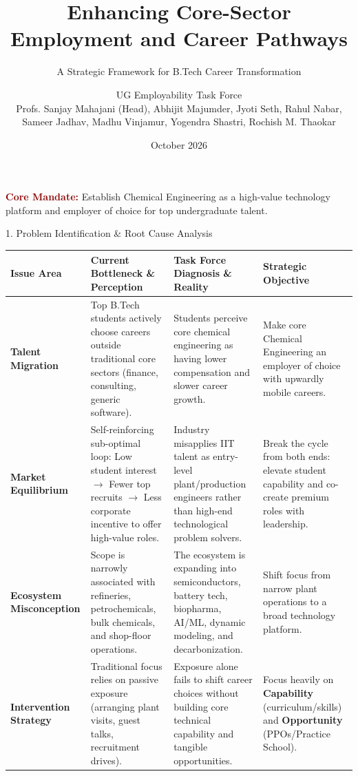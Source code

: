 \documentclass[aspectratio=169, 10pt]{beamer}
\title[IITB ChE Core Employability Roadmap]{Enhancing Core-Sector Employment and Career Pathways}
\subtitle{A Strategic Framework for B.Tech Career Transformation}
\author[UG Employability Task Force]{UG Employability Task Force \\ \small Profs. Sanjay Mahajani (Head), Abhijit Majumder, Jyoti Seth,  Rahul Nabar, Sameer Jadhav,  Madhu Vinjamur, Yogendra Shastri, Rochish M. Thaokar}
\institute[IIT Bombay]{Department of Chemical Engineering \\ Indian Institute of Technology Bombay}
\date{October 2026}
\begin{document}
\begin{frame}
  \titlepage
  \begin{center}
    \small \textcolor{darkred}{\textbf{Core Mandate:}} Establish Chemical Engineering as a high-value technology platform and employer of choice for top undergraduate talent.
  \end{center}
\end{frame}

\begin{frame}{1. Problem Identification \& Root Cause Analysis}
  \scriptsize
  \renewcommand{\arraystretch}{1.25}
  \centering
  \begin{tabular}{L{2.2cm} L{3.8cm} L{4.2cm} L{3.5cm}}
    \toprule
    \textbf{Issue Area} & \textbf{Current Bottleneck \& Perception} & \textbf{Task Force Diagnosis \& Reality} & \textbf{Strategic Objective} \\
    \midrule
    \textbf{Talent Migration} & Top B.Tech students actively choose careers outside traditional core sectors (finance, consulting, generic software). & Students perceive core chemical engineering as having lower compensation and slower career growth. & Make core Chemical Engineering an employer of choice with upwardly mobile careers. \\
    \addlinespace[3pt]
    \textbf{Market Equilibrium} & Self-reinforcing sub-optimal loop: Low student interest $\rightarrow$ Fewer top recruits $\rightarrow$ Less corporate incentive to offer high-value roles. & Industry misapplies IIT talent as entry-level plant/production engineers rather than high-end technological problem solvers. & Break the cycle from both ends: elevate student capability and co-create premium roles with leadership. \\
    \addlinespace[3pt]
    \textbf{Ecosystem Misconception} & Scope is narrowly associated with refineries, petrochemicals, bulk chemicals, and shop-floor operations. & The ecosystem is expanding into semiconductors, battery tech, biopharma, AI/ML, dynamic modeling, and decarbonization. & Shift focus from narrow plant operations to a broad technology platform. \\
    \addlinespace[3pt]
    \textbf{Intervention Strategy} & Traditional focus relies on passive exposure (arranging plant visits, guest talks, recruitment drives). & Exposure alone fails to shift career choices without building core technical capability and tangible opportunities. & Focus heavily on \textbf{Capability} (curriculum/skills) and \textbf{Opportunity} (PPOs/Practice School). \\
    \bottomrule
  \end{tabular}
\end{frame}
\end{document}
